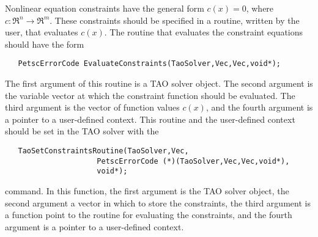Nonlinear equation constraints have the general form $c(x) = 0$, where 
$c: \Re^n \to \Re^m$.  These constraints should be specified in a routine, 
written by the user, that evaluates $c(x)$.  The routine that evaluates
the 
constraint equations should have the form
\begin{verbatim}
   PetscErrorCode EvaluateConstraints(TaoSolver,Vec,Vec,void*);
\end{verbatim}
The first argument of this routine is a TAO solver object.  The
second argument is the variable vector at which the constraint function
should be evaluated.  
The third argument is the vector of function values $c(x)$, and the fourth
argument is a pointer to a user-defined context.  This routine and the 
user-defined context should be set in the TAO solver with the 
\begin{verbatim}
   TaoSetConstraintsRoutine(TaoSolver,Vec,
                     PetscErrorCode (*)(TaoSolver,Vec,Vec,void*),
                     void*);
\end{verbatim}
command. 
In this function, the first argument is the TAO solver object, the second 
argument a vector in which to store the constraints, the third argument is
a function point to the routine for evaluating the constraints, and the
fourth argument is a pointer to a user-defined context.

